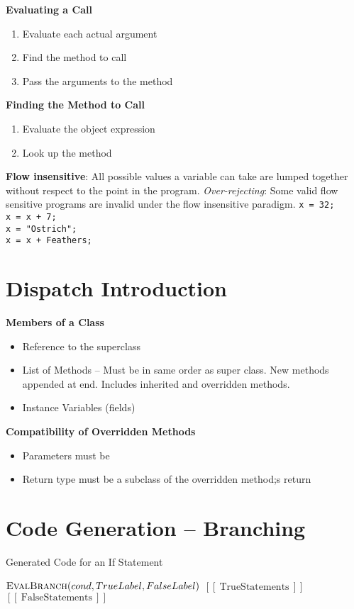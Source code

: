\documentclass[10pt,twocolumn]{report}
\begin{document}
\textbf{Evaluating a Call}
\begin{enumerate}
  \item Evaluate each actual argument
  \item Find the method to call
  \item Pass the arguments to the method
\end{enumerate}

\textbf{Finding the Method to Call}
\begin{enumerate}
  \item Evaluate the object expression
  \item Look up the method
\end{enumerate}

\textbf{Flow insensitive}: All possible values a variable can take are lumped together without respect to the point in the program.  \emph{Over-rejecting}: Some valid flow sensitive programs are invalid under the flow insensitive paradigm.
{\tt x = 32;}\\
{\tt x = x + 7;}\\
{\tt x = "Ostrich";}\\
{\tt x = x + Feathers;}
\section{Dispatch Introduction}

\textbf{Members of a Class}
\begin{itemize}
  \item Reference to the superclass
  \item List of Methods -- Must be in same order as super class.  New methods appended at end. Includes inherited and overridden methods.
  \item Instance Variables (fields)
\end{itemize}

\textbf{Compatibility of Overridden Methods}
\begin{itemize}
  \item Parameters must be
  \item Return type must be a subclass of the overridden method;s return
\end{itemize}

\section{Code Generation -- Branching}

\begin{algorithm}[h]
  \caption{Generated Code for an If Statement}
  \begin{algorithmic}[1]
    \State  $\Call{EvalBranch}{cond, TrueLabel, FalseLabel}$
    \State  {}
    \Indent
    \State    $\left[\left[~\textrm{TrueStatements}~\right]\right]$
    \State    {}
    \EndIndent
    \State  {}
    \Indent
    \State    $\left[\left[~\textrm{FalseStatements}~\right]\right]$
    \EndIndent
    \State  {}
    \EndProcedure
  \end{algorithmic}
\end{algorithm}
\end{document}

